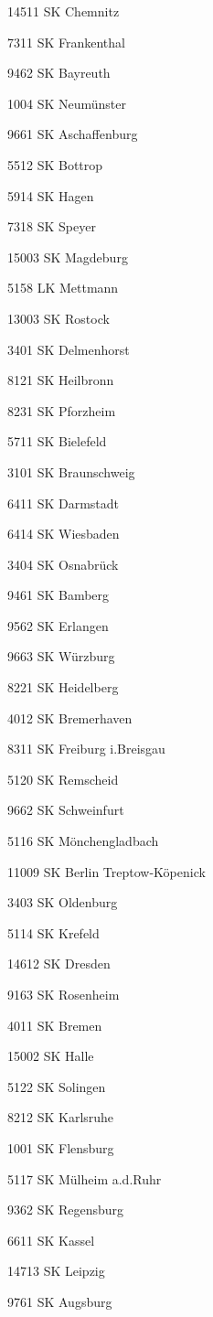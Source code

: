 14511  SK Chemnitz

7311  SK Frankenthal

9462  SK Bayreuth

1004  SK Neumünster

9661  SK Aschaffenburg

5512  SK Bottrop

5914  SK Hagen

7318  SK Speyer

15003  SK Magdeburg

5158  LK Mettmann

13003  SK Rostock

3401  SK Delmenhorst

8121  SK Heilbronn

8231  SK Pforzheim

5711  SK Bielefeld

3101  SK Braunschweig

6411  SK Darmstadt

6414  SK Wiesbaden

3404  SK Osnabrück

9461  SK Bamberg

9562  SK Erlangen

9663  SK Würzburg

8221  SK Heidelberg

4012  SK Bremerhaven

8311  SK Freiburg i.Breisgau

5120  SK Remscheid

9662  SK Schweinfurt

5116  SK Mönchengladbach

11009  SK Berlin Treptow-Köpenick

3403  SK Oldenburg

5114  SK Krefeld

14612  SK Dresden

9163  SK Rosenheim

4011  SK Bremen

15002  SK Halle

5122  SK Solingen

8212  SK Karlsruhe

1001  SK Flensburg

5117  SK Mülheim a.d.Ruhr

9362  SK Regensburg

6611  SK Kassel

14713  SK Leipzig

9761  SK Augsburg

